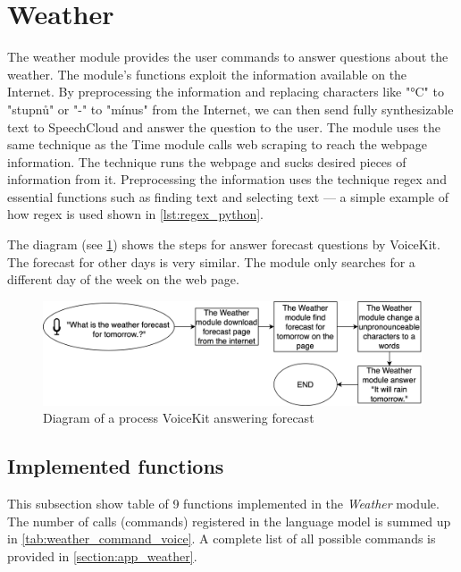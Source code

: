 \section{Weather}

The weather module provides the user commands to answer questions about the weather. The module's functions exploit the information available on the Internet. By preprocessing the information and replacing characters like "°C" to "stupnů" or "-" to "mínus" from the Internet, we can then send fully synthesizable text to SpeechCloud and answer the question to the user. The module uses the same technique as the Time module calls web scraping to reach the webpage information. The technique runs the webpage and sucks desired pieces of information from it. Preprocessing the information uses the technique regex and essential functions such as finding text and selecting text — a simple example of how regex is used shown in \cref{lst:regex_python}.

% 

The diagram (see \cref{fig:forecast_weather_diagram}) shows the steps for answer forecast questions by VoiceKit. The forecast for other days is very similar. The module only searches for a different day of the week on the web page. 

\begin{figure}[H]
    \centering
    \includegraphics[width=\textwidth]{img/forecast_weather_diagram.png}
    \caption{Diagram of a process VoiceKit answering forecast}
    \label{fig:forecast_weather_diagram}
\end{figure}
\newpage
\subsection{Implemented functions}

This subsection show table of 9 functions implemented in the \textit{Weather} module. The number of calls (commands) registered in the language model is summed up in \cref{tab:weather_command_voice}. A complete list of all possible commands is provided in \cref{section:app_weather}.

